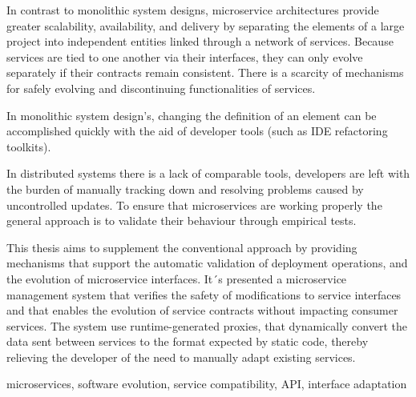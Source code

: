 
%

In contrast to monolithic system designs, microservice architectures provide greater scalability,
availability, and delivery by separating the elements of a large project into independent
entities linked through a network of services.
Because services are tied to one another via their interfaces, they can only evolve separately if their contracts remain consistent.
There is a scarcity of mechanisms for safely evolving and discontinuing functionalities of services.

In monolithic system design's, changing the definition of an element can be accomplished
quickly with the aid of developer tools (such as IDE refactoring toolkits).

In distributed systems there is a lack of comparable tools, developers are left
with the burden of manually tracking down and resolving problems caused by uncontrolled updates.
To ensure that microservices are working properly the general approach is to validate their behaviour through empirical tests.

This thesis aims to supplement the conventional approach by providing mechanisms that
support the automatic validation of deployment operations, and the evolution of microservice interfaces.
It´s presented a microservice management system that verifies the safety of modifications to
service interfaces and that enables the evolution of service contracts without impacting consumer services.
The system use runtime-generated proxies, that dynamically convert the data sent between services to the format
expected by static code, thereby relieving the developer of the need to manually adapt
existing services.

\begin{keywords}
    microservices, software evolution, service compatibility, API, interface adaptation
\end{keywords} 
